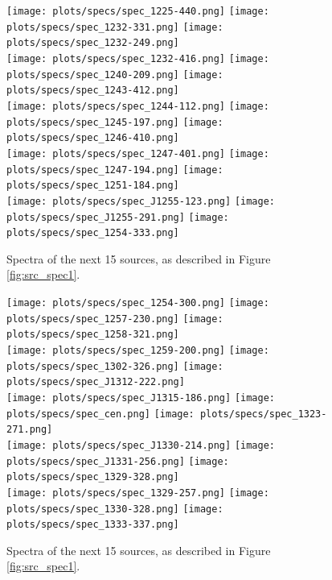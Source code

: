 \documentclass[preprint]{aastex}
\begin{document}
\begin{figure}\centering
\texttt{[image: plots/specs/spec\_1225-440.png]}
\texttt{[image: plots/specs/spec\_1232-331.png]}
\texttt{[image: plots/specs/spec\_1232-249.png]}\\
\texttt{[image: plots/specs/spec\_1232-416.png]}
\texttt{[image: plots/specs/spec\_1240-209.png]}
\texttt{[image: plots/specs/spec\_1243-412.png]}\\
\texttt{[image: plots/specs/spec\_1244-112.png]}
\texttt{[image: plots/specs/spec\_1245-197.png]}
\texttt{[image: plots/specs/spec\_1246-410.png]}\\
\texttt{[image: plots/specs/spec\_1247-401.png]}
\texttt{[image: plots/specs/spec\_1247-194.png]}
\texttt{[image: plots/specs/spec\_1251-184.png]}\\
\texttt{[image: plots/specs/spec\_J1255-123.png]}
\texttt{[image: plots/specs/spec\_J1255-291.png]}
\texttt{[image: plots/specs/spec\_1254-333.png]}\\
\caption{Spectra of the next 15 sources, as described in Figure \ref{fig:src_spec1}.
}\label{fig:src_spec18}
\end{figure}\clearpage

\begin{figure}\centering
\texttt{[image: plots/specs/spec\_1254-300.png]}
\texttt{[image: plots/specs/spec\_1257-230.png]}
\texttt{[image: plots/specs/spec\_1258-321.png]}\\
\texttt{[image: plots/specs/spec\_1259-200.png]}
\texttt{[image: plots/specs/spec\_1302-326.png]}
\texttt{[image: plots/specs/spec\_J1312-222.png]}\\
\texttt{[image: plots/specs/spec\_J1315-186.png]}
\texttt{[image: plots/specs/spec\_cen.png]}
\texttt{[image: plots/specs/spec\_1323-271.png]}\\
\texttt{[image: plots/specs/spec\_J1330-214.png]}
\texttt{[image: plots/specs/spec\_J1331-256.png]}
\texttt{[image: plots/specs/spec\_1329-328.png]}\\
\texttt{[image: plots/specs/spec\_1329-257.png]}
\texttt{[image: plots/specs/spec\_1330-328.png]}
\texttt{[image: plots/specs/spec\_1333-337.png]}\\
\caption{Spectra of the next 15 sources, as described in Figure \ref{fig:src_spec1}.
}\label{fig:src_spec19}
\end{figure}\clearpage
\end{document}
